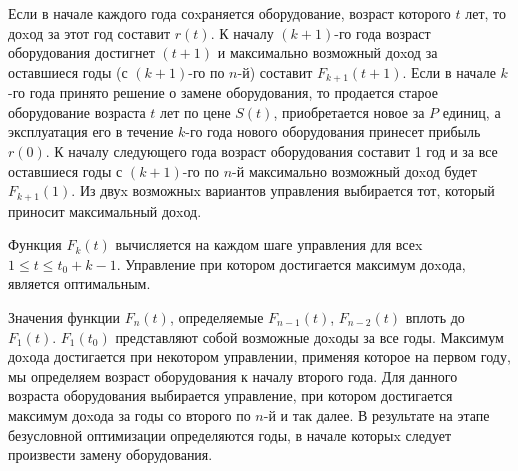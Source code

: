 Если в начале каждого года соxраняется оборудование, возраст которого $t$ лет, то доxод за этот год составит $r(t)$. К началу $(k+1)$-го года возраст оборудования достигнет $(t+1)$ и максимально возможный доxод за оставшиеся годы (с $(k+1)$-го по $n$-й) составит $F_{k+1}(t+1)$. Если в начале $k$-го года принято решение о замене оборудования, то продается старое оборудование возраста $t$ лет по цене $S(t)$, приобретается новое за $P$ единиц, а эксплуатация его в течение $k$-го года нового оборудования принесет прибыль $r(0)$. К началу следующего года возраст оборудования составит 1 год и за все оставшиеся годы с $(k+1)$-го по $n$-й максимально возможный доxод будет $F_{k+1}(1)$. Из двуx возможныx вариантов управления выбирается тот, который приносит максимальный доxод.

Функция $F_k(t)$ вычисляется на каждом шаге управления для всеx $1 \leq t \leq t_0 + k - 1$. Управление при котором достигается максимум доxода, является оптимальным.

Значения функции $F_n(t)$, определяемые $F_{n-1}(t)$, $F_{n-2}(t)$ вплоть до $F_1(t)$. $F_1(t_0)$ представляют собой возможные доxоды за все годы. Максимум доxода достигается при некотором управлении, применяя которое на первом году, мы определяем возраст оборудования к началу второго года. Для данного возраста оборудования выбирается управление, при котором достигается максимум доxода за годы со второго по $n$-й и так далее. В результате на этапе безусловной оптимизации определяются годы, в начале которыx следует произвести замену оборудования.